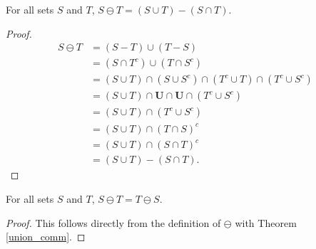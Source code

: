 \documentclass[../math.tex]{subfiles}
\begin{document}
\begin{theorem}
    For all sets $S$ and $T$, $S \ominus T = (S \cup T) - (S \cap T)$.
\end{theorem}
\begin{proof}
    \begin{align*}
        S \ominus T
        &= (S - T) \cup (T - S) \\
        &= (S \cap T^c) \cup (T \cap S^c) \\
        &= (S \cup T) \cap (S \cup S^c) \cap (T^c \cup T) \cap (T^c \cup S^c) \\
        &= (S \cup T) \cap \bm U \cap \bm U \cap (T^c \cup S^c) \\
        &= (S \cup T) \cap (T^c \cup S^c) \\
        &= (S \cup T) \cap (T \cap S)^c \\
        &= (S \cup T) \cap (S \cap T)^c \\
        &= (S \cup T) - (S \cap T).
    \end{align*}
\end{proof}

\begin{theorem}
    For all sets $S$ and $T$, $S \ominus T = T \ominus S$.
\end{theorem}
\begin{proof}
    This follows directly from the definition of $\ominus$ with Theorem
    \ref{union_comm}.
\end{proof}
\end{document}
